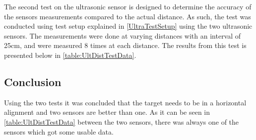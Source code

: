 The second test on the ultrasonic sensor is designed to determine the accuracy
of the sensors measurements compared to the actual distance. As such, the test
was conducted using test setup explained in \autoref{UltraTestSetup} using the
two ultrasonic sensors. The measurements were done at varying distances with an
interval of 25cm, and were measured 8 times at each distance. The results from
this test is presented below in \autoref{table:UltDistTestData}. 

\subsection{Conclusion}
Using the two tests it was concluded that the target needs to be in a horizontal
alignment and two sensors are better than one. As it can be seen in
\autoref{table:UltDistTestData} between the two sensors, there was always one
of the sensors which got some usable data. 

% 




